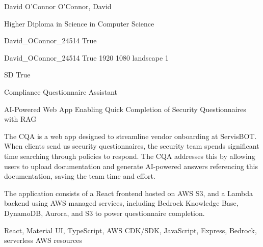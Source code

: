 
\begingroup{}\relax



\def\Key{David_OConnor_24514}

{David O'Connor}
{O'Connor, David}

{Higher Diploma in Science in Computer Science}

{David_OConnor_24514}
{True}

{David_OConnor_24514}
{True}
{1920}
{1080}
{landscape}
{1}

{SD}
{True}

{Compliance Questionnaire Assistant}

{AI-Powered Web App Enabling Quick Completion of Security Questionnaires with RAG}

{The CQA is a web app designed to streamline vendor onboarding at ServisBOT. When clients send us security questionnaires, the security team spends significant time searching through policies to respond. The CQA addresses this by allowing users to upload documentation and generate AI-powered answers referencing this documentation, saving the team time and effort.

The application consists of a React frontend hosted on AWS S3, and a Lambda backend using AWS managed services, including Bedrock Knowledge Base, DynamoDB, Aurora, and S3 to power questionnaire completion.}

{React, Material UI, TypeScript, AWS CDK/SDK, JavaScript, Express, Bedrock, serverless AWS resources}

